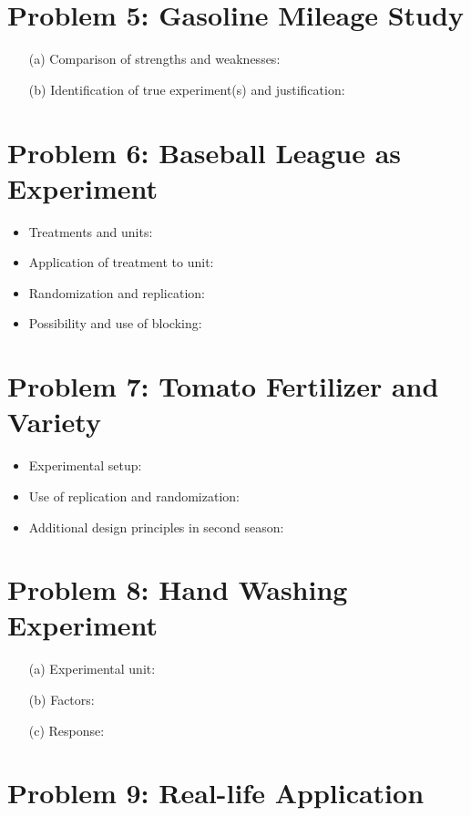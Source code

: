 \documentclass[10pt, oneside]{article}
\begin{document}
\section*{Problem 5: Gasoline Mileage Study}
\begin{itemize}
	\item[(a)] Comparison of strengths and weaknesses:
	\item[(b)] Identification of true experiment(s) and justification:
\end{itemize}

\section*{Problem 6: Baseball League as Experiment}
\begin{itemize}
	\item Treatments and units:
	\item Application of treatment to unit:
	\item Randomization and replication:
	\item Possibility and use of blocking:
\end{itemize}

\section*{Problem 7: Tomato Fertilizer and Variety}
\begin{itemize}
	\item Experimental setup:
	\item Use of replication and randomization:
	\item Additional design principles in second season:
\end{itemize}

\section*{Problem 8: Hand Washing Experiment}
\begin{itemize}
	\item[(a)] Experimental unit:
	\item[(b)] Factors:
	\item[(c)] Response:
\end{itemize}

\section*{Problem 9: Real-life Application}
\end{document}
